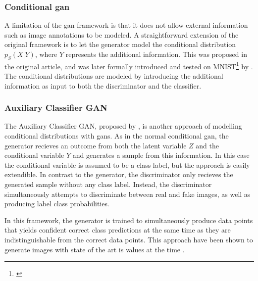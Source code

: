 \subsubsection{Conditional \acrshort{gan}}
A limitation of the \acrshort{gan} framework is that it does not allow external information such as image annotations to be modeled. A straightforward extension of the original framework is to let the generator model the conditional distribution $p_S(X|Y)$, where $Y$ represents the additional information. This was proposed in the original article, and was later formally introduced and tested on MNIST\footnote{\textcite{lecun2010mnist}} by \textcite{mirza2014conditional}. The conditional distributions are modeled by introducing the additional information as input to both the discriminator and the classifier.


\subsubsection{Auxiliary Classifier GAN}
The Auxiliary Classifier GAN, proposed by \textcite{odena2016conditional}, is another approach of modelling conditional distributions with \acrshort{gans}. As in the normal conditional \acrshort{gan}, the generator recieves an outcome from both the latent variable $Z$ and the conditional variable $Y$ and generates a sample from this information. In this case the conditional variable is assumed to be a class label, but the approach is easily extendible. In contrast to the generator, the discriminator only recieves the generated sample without any class label. Instead, the discriminator simultaneously attempts to discriminate between real and fake images, as well as producing label class probabilities.

In this framework, the generator is trained to simultaneously produce data points that yields confident correct class predictions at the same time as they are indistinguishable from the correct data points. This approach have been shown to generate images with state of the art \acrlong{is} values at the time \parencite{odena2016conditional}.


